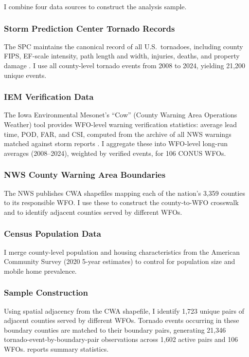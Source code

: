 \documentclass[12pt]{article}
\begin{document}
I combine four data sources to construct the analysis sample.

\subsubsection*{Storm Prediction Center Tornado Records} The SPC maintains the canonical record of all U.S.\ tornadoes, including county FIPS, EF-scale intensity, path length and width, injuries, deaths, and property damage \citep{spc2024}. I use all county-level tornado events from 2008 to 2024, yielding 21,200 unique events.

\subsubsection*{IEM Verification Data} The Iowa Environmental Mesonet's ``Cow'' (County Warning Area Operations Weather) tool provides WFO-level warning verification statistics: average lead time, POD, FAR, and CSI, computed from the archive of all NWS warnings matched against storm reports \citep{iem2024}. I aggregate these into WFO-level long-run averages (2008--2024), weighted by verified events, for 106 CONUS WFOs.

\subsubsection*{NWS County Warning Area Boundaries} The NWS publishes CWA shapefiles mapping each of the nation's 3,359 counties to its responsible WFO. I use these to construct the county-to-WFO crosswalk and to identify adjacent counties served by different WFOs.

\subsubsection*{Census Population Data} I merge county-level population and housing characteristics from the American Community Survey (2020 5-year estimates) to control for population size and mobile home prevalence.

\subsubsection*{Sample Construction} Using spatial adjacency from the CWA shapefile, I identify 1,723 unique pairs of adjacent counties served by different WFOs. Tornado events occurring in these boundary counties are matched to their boundary pairs, generating 21,346 tornado-event-by-boundary-pair observations across 1,602 active pairs and 106 WFOs.  reports summary statistics.
\end{document}
